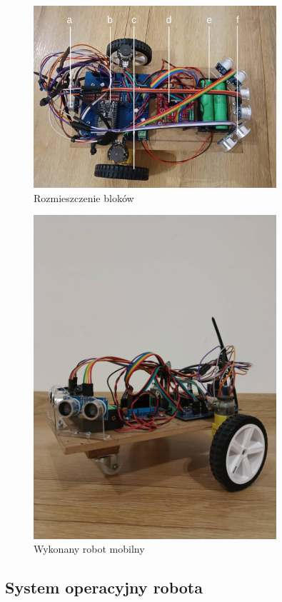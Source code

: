 \documentclass[12pt,twoside]{article}
\begin{document}
\begin{figure}[ht]%
 \centering%
 \includegraphics[width=9cm]{figures/robot/robot_up.jpg}%
 \caption{Rozmieszczenie bloków}%
 \label{Fig:robot_const2}%
\end{figure}



\begin{figure}[ht]%
 \centering%
 \includegraphics[width=9cm]{figures/robot/robot2.jpg}%
 \caption{Wykonany robot mobilny}%
 \label{Fig:robot_const1}%
\end{figure}

\clearpage

\subsection{System operacyjny robota}
\end{document}
